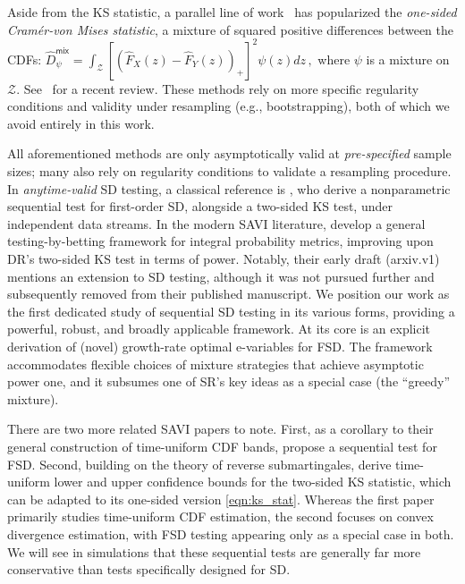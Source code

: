 \documentclass[12pt,twoside]{article}
\theoremstyle{plain}
\theoremstyle{definition}
\theoremstyle{remark}
\newcommand{\insquare}[1]{\left[#1\right]}
\newcommand{\calZ}{\mathcal{Z}}
\begin{document}
Aside from the KS statistic, a parallel line of work~\citep{linton2005consistent,linton2010improved} has popularized the \emph{one-sided Cram\'er-von Mises statistic}, a mixture of squared positive differences between the CDFs:
$ \hat{D}^\mathsf{mix}_\psi = \int_\calZ \insquare{(\hat{F}_X(z) - \hat{F}_Y(z))_+}^2  \psi(z) dz\,,$
where $\psi$ is a mixture on $\calZ$. 
See~\citet{whang2019econometric} for a recent review. 
These methods rely on more specific regularity conditions and validity under resampling (e.g., bootstrapping), both of which we avoid entirely in this work. 


All aforementioned methods are only asymptotically valid at \emph{pre-specified} sample sizes; many also rely on regularity conditions to validate a resampling procedure. 
In \emph{anytime-valid} SD testing, a classical reference is \citet[][DR]{darling1968some}, who derive a nonparametric sequential test for first-order SD, alongside a two-sided KS test, under independent data streams. 
In the modern SAVI literature, \citet[][SR]{shekhar2023nonparametric} develop a general testing-by-betting framework for integral probability metrics, improving upon DR's two-sided KS test in terms of power. 
Notably, their early draft (arxiv.v1) mentions an extension to SD testing, although it was not pursued further and subsequently removed from their published manuscript. 
We position our work as the first dedicated study of sequential SD testing in its various forms, providing a powerful, robust, and broadly applicable framework.
At its core is an explicit derivation of (novel) growth-rate optimal e-variables for FSD. The framework accommodates flexible choices of mixture strategies that achieve asymptotic power one, and it subsumes one of SR's key ideas as a special case (the ``greedy'' mixture).


There are two more related SAVI papers to note. 
First, as a corollary to their general construction of time-uniform CDF bands, \citet{howard2022sequential} propose a sequential test for FSD. 
Second, building on the theory of reverse submartingales, \citet{manole2023martingale} derive time-uniform lower and upper confidence bounds for the two-sided KS statistic, which can be adapted to its one-sided version \eqref{eqn:ks_stat}. 
Whereas the first paper primarily studies time-uniform CDF estimation, the second focuses on convex divergence estimation, with FSD testing appearing only as a special case in both.
We will see in simulations that these sequential tests are generally far more conservative than tests specifically designed for SD.
\end{document}
